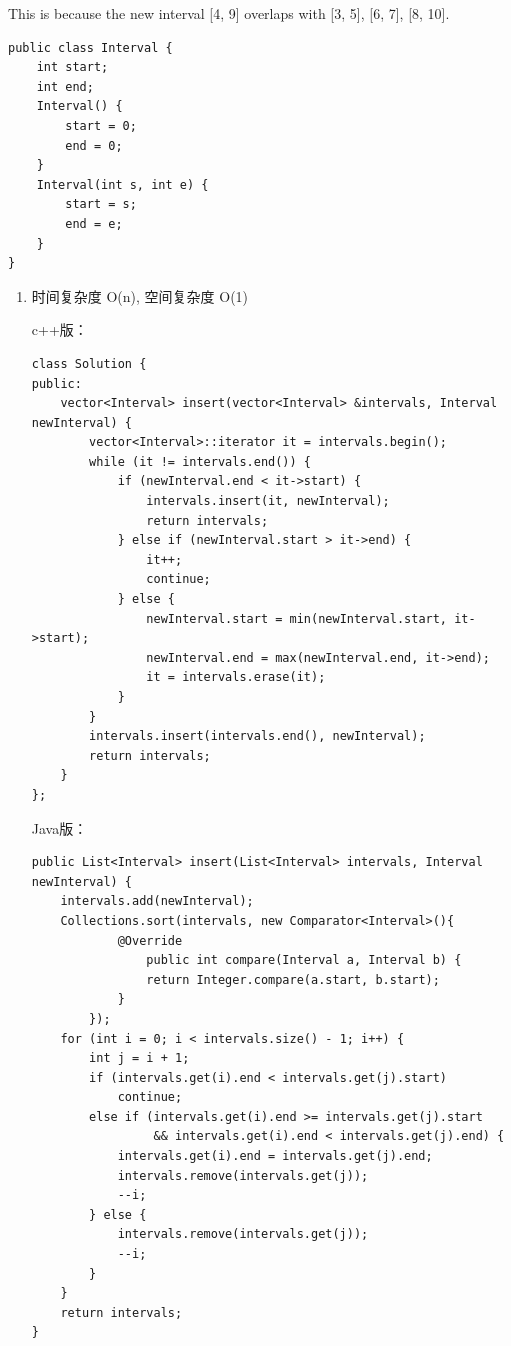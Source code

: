 \documentclass[12pt]{book}
\begin{document}
This is because the new interval [4, 9] overlaps with [3, 5], [6, 7], [8, 10].

\lstset{language=java,label= ,caption= ,numbers=none}
\begin{lstlisting}
public class Interval {
    int start;
    int end;
    Interval() {
        start = 0;
        end = 0;
    }
    Interval(int s, int e) {
        start = s;
        end = e;
    }
}
\end{lstlisting}

\begin{enumerate}
\item 时间复杂度 O(n), 空间复杂度 O(1)
\label{sec-20-1-5-1}

c++版：
\lstset{language=java,label= ,caption= ,numbers=none}
\begin{lstlisting}
class Solution {
public:
    vector<Interval> insert(vector<Interval> &intervals, Interval newInterval) {
        vector<Interval>::iterator it = intervals.begin();
        while (it != intervals.end()) {
            if (newInterval.end < it->start) {
                intervals.insert(it, newInterval);
                return intervals;
            } else if (newInterval.start > it->end) {
                it++;
                continue;
            } else {
                newInterval.start = min(newInterval.start, it->start);
                newInterval.end = max(newInterval.end, it->end);
                it = intervals.erase(it);
            }
        }
        intervals.insert(intervals.end(), newInterval);
        return intervals;
    }
};
\end{lstlisting}

Java版：
\lstset{language=java,label= ,caption= ,numbers=none}
\begin{lstlisting}
public List<Interval> insert(List<Interval> intervals, Interval newInterval) {
    intervals.add(newInterval);
    Collections.sort(intervals, new Comparator<Interval>(){
            @Override
                public int compare(Interval a, Interval b) {
                return Integer.compare(a.start, b.start);
            }
        });
    for (int i = 0; i < intervals.size() - 1; i++) {
        int j = i + 1;
        if (intervals.get(i).end < intervals.get(j).start)
            continue;
        else if (intervals.get(i).end >= intervals.get(j).start
                 && intervals.get(i).end < intervals.get(j).end) {
            intervals.get(i).end = intervals.get(j).end;
            intervals.remove(intervals.get(j));
            --i;
        } else {
            intervals.remove(intervals.get(j));
            --i;
        }
    }
    return intervals;
}
\end{lstlisting}
\end{enumerate}
\end{document}
